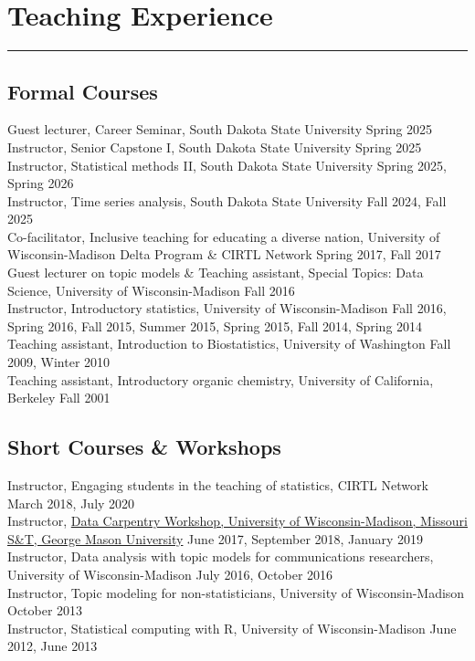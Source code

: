 \documentclass[
  10pt,
]
{article}
\begin{document}
\section{Teaching Experience}\label{teaching-experience}

\hrule

\subsection{Formal Courses}\label{formal-courses}

\normalsize Guest lecturer, Career Seminar, South Dakota State
University \hfill Spring 2025\\
\normalsize Instructor, Senior Capstone I, South Dakota State University
\hfill Spring 2025\\
\normalsize Instructor, Statistical methods II, South Dakota State
University \hfill Spring 2025, Spring 2026\\
\normalsize Instructor, Time series analysis, South Dakota State
University \hfill Fall 2024, Fall 2025\\
\normalsize Co-facilitator, Inclusive teaching for educating a diverse
nation, University of Wisconsin-Madison Delta Program \& CIRTL Network
\hfill Spring 2017, Fall 2017\\
\normalsize Guest lecturer on topic models \& Teaching assistant,
Special Topics: Data Science, University of Wisconsin-Madison
\hfill Fall 2016\\
\normalsize Instructor, Introductory statistics, University of
Wisconsin-Madison \hfill Fall 2016, Spring 2016, Fall 2015, Summer 2015,
Spring 2015, Fall 2014, Spring 2014\\
\normalsize Teaching assistant, Introduction to Biostatistics,
University of Washington \hfill Fall 2009, Winter 2010\\
\normalsize Teaching assistant, Introductory organic chemistry,
University of California, Berkeley \hfill Fall 2001

\subsection{Short Courses \& Workshops}\label{short-courses-workshops}

\normalsize Instructor, Engaging students in the teaching of statistics,
CIRTL Network \hfill March 2018, July 2020\\
\normalsize Instructor,
\href{https://uw-madison-aci.github.io/2017-06-19-uwmadison-dc/}{Data
Carpentry Workshop, University of Wisconsin-Madison, Missouri S\&T,
George Mason University} \hfill June 2017, September 2018, January
2019\\
\normalsize Instructor, Data analysis with topic models for
communications researchers, University of Wisconsin-Madison \hfill July
2016, October 2016\\
\normalsize Instructor, Topic modeling for non-statisticians, University
of Wisconsin-Madison \hfill October 2013\\
\normalsize Instructor, Statistical computing with R, University of
Wisconsin-Madison \hfill June 2012, June 2013
\end{document}
